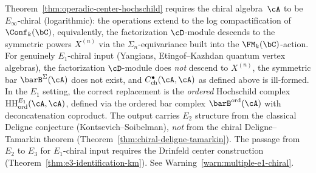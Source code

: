 \begin{remark}
\label{rem:center-scope-e-inf}
Theorem~\ref{thm:operadic-center-hochschild} requires the chiral
algebra~$\cA$ to be $E_\infty$-chiral (logarithmic): the
operations extend to the log compactification of
$\Conf_k(\bC)$, equivalently, the factorization $\cD$-module
descends to the symmetric powers $X^{(n)}$ via the
$\Sigma_n$-equivariance built into the $\FM_k(\bC)$-action.
For genuinely $E_1$-chiral input (Yangians, Etingof--Kazhdan
quantum vertex algebras), the factorization $\cD$-module does
\emph{not} descend to $X^{(n)}$, the symmetric bar
$\barB^{\Sigma}(\cA)$ does not exist, and
$C^\bullet_{\mathrm{ch}}(\cA, \cA)$ as defined above is
ill-formed. In the $E_1$ setting, the correct replacement is
the \emph{ordered} Hochschild complex
$\mathrm{HH}^{E_1}_{\mathrm{ord}}(\cA, \cA)$, defined via
the ordered bar complex $\barB^{\mathrm{ord}}(\cA)$ with
deconcatenation coproduct. The output carries $E_2$ structure
from the classical Deligne conjecture (Kontsevich--Soibelman),
\emph{not} from the chiral Deligne--Tamarkin theorem
(Theorem~\ref{thm:chiral-deligne-tamarkin}). The passage from
$E_2$ to $E_3$ for $E_1$-chiral input requires the Drinfeld
center construction
(Theorem~\ref{thm:e3-identification-km}).
See Warning~\ref{warn:multiple-e1-chiral}.
\end{remark}

